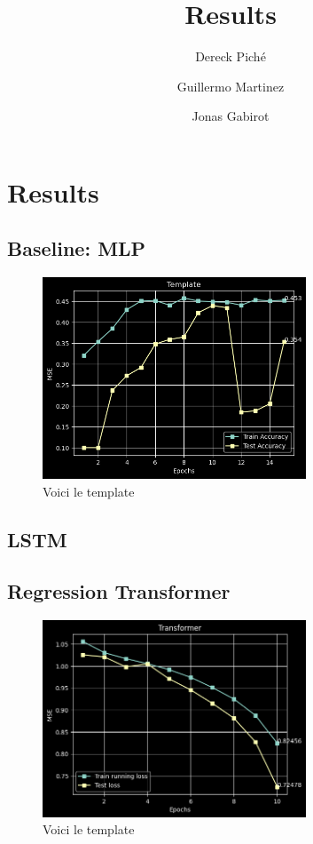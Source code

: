 \documentclass{article}
\title{Results}
\author
{
    Dereck Piché \and
    Guillermo Martinez \and
    Jonas Gabirot \and
}
\begin{document}
\maketitle

\section{Results}


\subsection{Baseline: MLP}

\begin{figure} \label{fig:template}
    \caption{Voici le template} \center
    \includegraphics[width=0.7\textwidth]{images/2023-03-28-10-29-38.png}
\end{figure}

\subsection{LSTM}

\subsection{Regression Transformer}
\begin{figure} \label{fig:template}
    \caption{Voici le template} \center
    \includegraphics[width=0.7\textwidth]{images/2023-03-30-14-15-52.png}
\end{figure}
\end{document}
